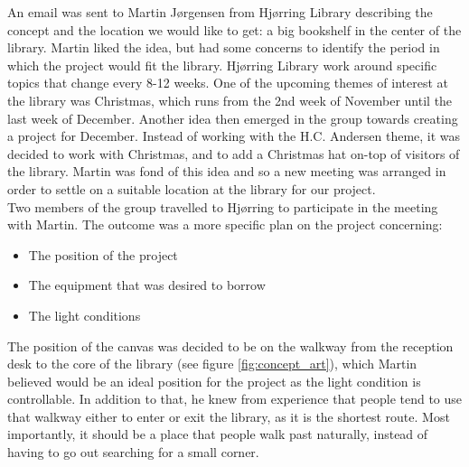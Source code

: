 An email was sent to Martin J{\o}rgensen from Hj{\o}rring Library describing the concept and the location we would like to get: a big bookshelf in the center of the library. Martin liked the idea, but had some concerns to identify the period in which the project would fit the library. Hj{\o}rring Library work around specific topics that change every 8-12 weeks. One of the upcoming themes of interest at the library was Christmas, which runs from the 2nd week of November until the last week of December. Another idea then emerged in the group towards creating a project for December. Instead of working with the H.C. Andersen theme, it was decided to work with Christmas, and to add a Christmas hat on-top of visitors of the library. Martin was fond of this idea and so a new meeting was arranged in order to settle on a suitable location at the library for our project.\\
Two members of the group travelled to Hj{\o}rring to participate in the meeting with Martin. The outcome was a more specific plan on the project concerning:

\begin{itemize}
\item The position of the project
\item The equipment that was desired to borrow
\item The light conditions
\end{itemize}

The position of the canvas was decided to be on the walkway from the reception desk to the core of the library (see figure \ref{fig:concept_art}), which Martin believed would be an ideal position for the project as the light condition is controllable. In addition to that, he knew from experience that people tend to use that walkway either to enter or exit the library, as it is the shortest route. Most importantly, it should be a place that people walk past naturally, instead of having to go out searching for a small corner.

